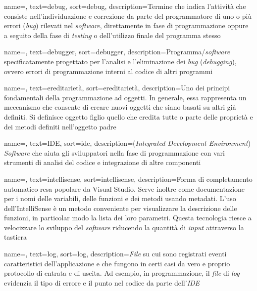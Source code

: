 {
    name=,
    text=debug,
    sort=debug,
    description={Termine che indica l’attività che
    consiste nell’individuazione e correzione da parte del programmatore di uno o più
    errori (\textit{bug}) rilevati nel \textit{software}, direttamente in fase di programmazione oppure
    a seguito della fase di \textit{testing} o dell’utilizzo finale del programma stesso \cite{siteE:wiki}}
}

{
    name=,
    text=debugger,
    sort=debugger,
    description={Programma/\textit{software} specificatamente
    progettato per l’analisi e l’eliminazione dei \textit{bug} (\textit{debugging}), ovvero errori di
    programmazione interni al codice di altri programmi \cite{siteE:wiki}}
}

{
    name=,
    text=ereditarietà,
    sort=ereditarietà,
    description={Uno dei principi fondamentali della programmazione ad oggetti. In
    generale, essa rappresenta un meccanismo che consente di creare nuovi oggetti
    che siano basati su altri già definiti. Si definisce oggetto figlio 
    quello che eredita tutte o parte delle proprietà e dei metodi definiti nell’oggetto
    padre \cite{siteE:wiki}}
}

{
    name=,
    text=IDE,
    sort=ide,
    description={(\textit{Integrated Development Environment})
    \textit{Software} che aiuta gli sviluppatori nella fase di programmazione con vari strumenti
    di analisi del codice e integrazione di altre componenti \cite{siteE:wiki}}
}

{
    name=,
    text=intellisense,
    sort=intellisense,
    description={Forma di completamento automatico resa popolare da Visual Studio.
    Serve inoltre come documentazione per i
    nomi delle variabili, delle funzioni e dei metodi usando metadati. L’uso
    dell’IntelliSense è un metodo conveniente per visualizzare la descrizione delle
    funzioni, in particolar modo la lista dei loro parametri. Questa tecnologia riesce
    a velocizzare lo sviluppo del \textit{software} riducendo la quantità di \textit{input} attraverso
    la tastiera \cite{siteE:wiki}}
}

{
    name=,
    text=log,
    sort=log,
    description={\textit{File} su cui sono registrati eventi caratteristici dell’applicazione e che fungono
    in certi casi da vero e proprio protocollo di entrata e di uscita. Ad esempio, in
    programmazione, il \textit{file} di \textit{log} evidenzia il tipo di errore e il punto nel codice
    da parte dell’\textit{IDE} \cite{siteE:wiki}}
}

